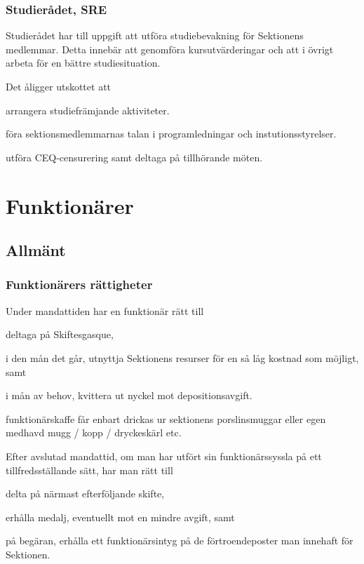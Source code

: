 \documentclass[10pt]{article}
\begin{document}
\subsubsection{Studierådet, SRE}
Studierådet har till uppgift att utföra studiebevakning för Sektionens medlemmar. Detta innebär att genomföra kursutvärderingar och att i övrigt arbeta för en bättre studiesituation.

Det åligger utskottet att
\begin{tightdashlist}
\item arrangera studiefrämjande aktiviteter.
\item föra sektionsmedlemmarnas talan i programledningar och instutionsstyrelser.
\item utföra CEQ-censurering samt deltaga på tillhörande möten.
\end{tightdashlist}

\section{Funktionärer} %
\subsection{Allmänt}
\subsubsection{Funktionärers rättigheter}
Under mandattiden har en funktionär rätt till
\begin{attlist}
    \item deltaga på Skiftesgasque,
    \item i den mån det går, utnyttja Sektionens resurser för en så låg
        kostnad som möjligt, samt
    \item i mån av behov, kvittera ut nyckel mot depositionsavgift.
    \item funktionärskaffe får enbart drickas ur sektionens porslinsmuggar eller egen medhavd mugg / kopp / dryckeskärl etc.
\end{attlist}

Efter avslutad mandattid, om man har utfört sin funktionärssyssla på ett
tillfredsställande sätt, har man rätt till
\begin{attlist}
    \item delta på närmast efterföljande skifte,
    \item erhålla medalj, eventuellt mot en mindre avgift, samt
    \item på begäran, erhålla ett funktionärsintyg på de förtroendeposter
        man innehaft för Sektionen.
\end{attlist}
\end{document}
